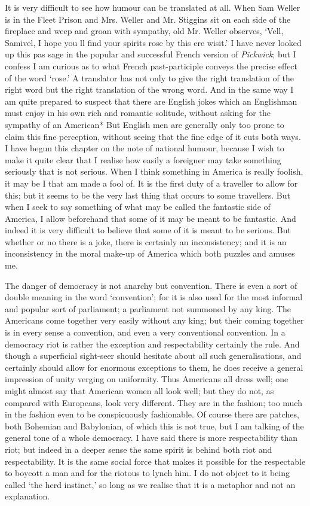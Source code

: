 \documentclass{book}
\begin{document}
It is very difficult to see how humour can be translated at all. When Sam Weller is in the Fleet Prison and Mrs. Weller and Mr. Stiggins sit on each side of the fireplace and weep and groan with sympathy, old Mr. Weller observes, ‘Vell, Samivel, I hope you ll find your spirits rose by this ere wisit.’ I have never looked up this pas sage in the popular and successful French version of \emph{Pickwick}; but I confess I am curious as to what French past-participle conveys the precise effect of the word ‘rose.’ A translator has not only to give the right translation of the right word but the right translation of the wrong word. And in the same way I am quite prepared to suspect that there are English jokes which an Englishman must enjoy in his own rich and romantic solitude, without asking for the sympathy of an American* But English men are generally only too prone to claim this fine perception, without seeing that the fine edge of it cuts both ways. I have begun this chapter on the note of national humour, because I wish to make it quite clear that I realise how easily a foreigner may take something seriously that is not serious. When I think something in America is really foolish, it may be I that am made a fool of. It is the first duty of a traveller to allow for this; but it seems to be the very last thing that occurs to some travellers. But when I seek to say something of what may be called the fantastic side of America, I allow beforehand that some of it may be meant to be fantastic. And indeed it is very difficult to believe that some of it is meant to be serious. But whether or no there is a joke, there is certainly an inconsistency; and it is an inconsistency in the moral make-up of America which both puzzles and amuses me.

The danger of democracy is not anarchy but convention. There is even a sort of double meaning in the word ‘convention’; for it is also used for the most informal and popular sort of parliament; a parliament not summoned by any king. The Americans come together very easily without any king; but their coming together is in every sense a convention, and even a very conventional convention. In a democracy riot is rather the exception and respectability certainly the rule. And though a superficial sight-seer should hesitate about all such generalisations, and certainly should allow for enormous exceptions to them, he does receive a general impression of unity verging on uniformity. Thus Americans all dress well; one might almost say that American women all look well; but they do not, as compared with Europeans, look very different. They are in the fashion; too much in the fashion even to be conspicuously fashionable. Of course there are patches, both Bohemian and Babylonian, of which this is not true, but I am talking of the general tone of a whole democracy. I have said there is more respectability than riot; but indeed in a deeper sense the same spirit is behind both riot and respectability. It is the same social force that makes it possible for the respectable to boycott a man and for the riotous to lynch him. I do not object to it being called ‘the herd instinct,’ so long as we realise that it is a metaphor and not an explanation.
\end{document}
